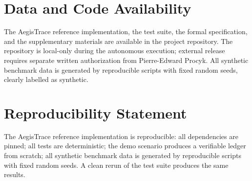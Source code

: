 \documentclass[11pt,a4paper]{article}
\begin{document}
\section*{Data and Code Availability}

The AegisTrace reference implementation, the test suite, the formal specification, and the supplementary materials are available in the project repository. The repository is local-only during the autonomous execution; external release requires separate written authorization from Pierre-Edward Procyk. All synthetic benchmark data is generated by reproducible scripts with fixed random seeds, clearly labelled as synthetic.

\section*{Reproducibility Statement}

The AegisTrace reference implementation is reproducible: all dependencies are pinned; all tests are deterministic; the demo scenario produces a verifiable ledger from scratch; all synthetic benchmark data is generated by reproducible scripts with fixed random seeds. A clean rerun of the test suite produces the same results.



\end{document}
